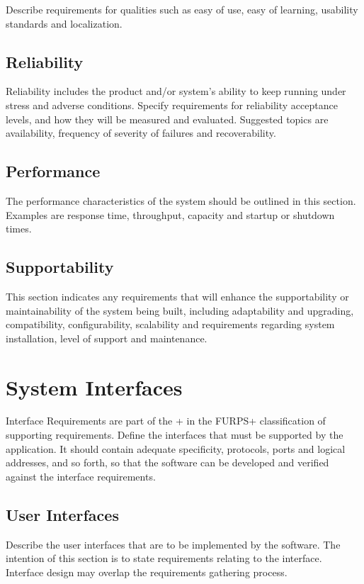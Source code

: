 Describe requirements for qualities such as easy of use, easy of learning, usability standards and localization.

\subsection{Reliability}

Reliability includes the product and/or system's ability to keep running under stress and adverse conditions. Specify requirements for reliability acceptance levels, and how they will be measured and evaluated. Suggested topics are availability, frequency of severity of failures and recoverability.

\subsection{Performance}

The performance characteristics of the system should be outlined in this section. Examples are response time, throughput, capacity and startup or shutdown times.

\subsection{Supportability}

This section indicates any requirements that will enhance the supportability or maintainability of the system being built, including adaptability and upgrading, compatibility, configurability, scalability and requirements regarding system installation, level of support and maintenance.

\section{System Interfaces}

Interface Requirements are part of the + in the FURPS+ classification of supporting requirements. Define the interfaces that must be supported by the application. It should contain adequate specificity, protocols, ports and logical addresses, and so forth, so that the software can be developed and verified against the interface requirements.

\subsection{User Interfaces}

Describe the user interfaces that are to be implemented by the software. The intention of this section is to state requirements relating to the interface. Interface design may overlap the requirements gathering process.

